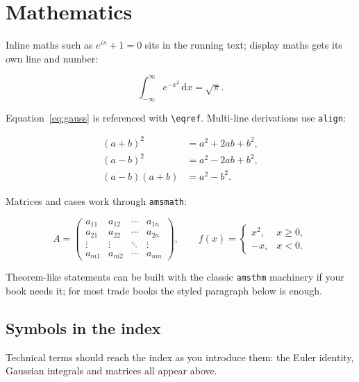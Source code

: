 \chapter{Mathematics}\label{ch:maths}

Inline maths such as $e^{i\pi} + 1 = 0$ sits in the running text;
display maths gets its own line and number:

\begin{equation}\label{eq:gauss}
  \int_{-\infty}^{\infty} e^{-x^{2}} \,\mathrm{d}x = \sqrt{\pi}.
\end{equation}

Equation~\eqref{eq:gauss} is referenced with \texttt{\textbackslash eqref}. Multi-line
derivations use \texttt{align}:

\begin{align}
  (a+b)^2 &= a^2 + 2ab + b^2,\\
  (a-b)^2 &= a^2 - 2ab + b^2,\\
  (a-b)(a+b) &= a^2 - b^2.
\end{align}

Matrices and cases work through \texttt{amsmath}:

\begin{equation}
  A = \begin{pmatrix}
        a_{11} & a_{12} & \cdots & a_{1n}\\
        a_{21} & a_{22} & \cdots & a_{2n}\\
        \vdots & \vdots & \ddots & \vdots\\
        a_{m1} & a_{m2} & \cdots & a_{mn}
      \end{pmatrix},
  \qquad
  f(x) = \begin{cases}
           x^{2}, & x \geq 0,\\
           -x,    & x < 0.
         \end{cases}
\end{equation}

Theorem-like statements can be built with the classic
\texttt{amsthm} machinery if your book needs it; for most trade
books the styled paragraph below is enough.

\section{Symbols in the index}
Technical terms should reach the index as you introduce them: the
Euler identity, Gaussian
integrals and
matrices all appear above.

